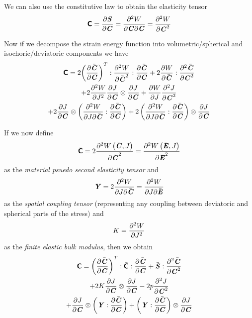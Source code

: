 We can also use the constitutive law to obtain the elasticity tensor \ie
\begin{equation}
  \tensorfour{C}=\delby{\tensor{S}}{\tensor{C}}=\deltwoby{W}{\tensor{C}}{\tensor{C}}=\deltwosqby{W}{\tensor{C}}
\end{equation}

Now if we decompose the strain energy function into volumetric/spherical and
isochoric/deviatoric components we have
\begin{multline}
  \tensorfour{C}=2\doubledotprod{\doubledotprod{\transpose{\pbrac{\delby{\bar{\tensor{C}}}{\tensor{C}}}}}{\deltwosqby{W}{\bar{\tensor{C}}}}}{\delby{\bar{\tensor{C}}}{\tensor{C}}}+2\doubledotprod{\delby{W}{\bar{\tensor{C}}}}{\deltwosqby{\bar{\tensor{C}}}{\tensor{C}}}\\
  +2\deltwosqby{W}{J}\tensorprod{\delby{J}{\tensor{C}}}{\delby{J}{\tensor{C}}}+\delby{W}{J}\deltwosqby{J}{\tensor{C}}\\
  +2\tensorprod{\delby{J}{\tensor{C}}}{\pbrac{\doubledotprod{\deltwoby{W}{J}{\bar{\tensor{C}}}}{\delby{\bar{\tensor{C}}}{\tensor{C}}}}}+2\tensorprod{\pbrac{\doubledotprod{\deltwoby{W}{J}{\bar{\tensor{C}}}}{\delby{\bar{\tensor{C}}}{\tensor{C}}}}}{\delby{J}{\tensor{C}}}
\end{multline}

If we now define
\begin{equation}
  \bar{\tensorfour{C}}=2\deltwosqby{\fnof{W}{\bar{\tensor{C}},J}}{\bar{\tensor{C}}}=\deltwosqby{\fnof{W}{\bar{\tensor{E}},J}}{\bar{\tensor{E}}}
\end{equation}
as the \emph{material psuedo second elasticity tensor} and
\begin{equation}
  \tensor{Y}=2\deltwoby{W}{J}{\bar{\tensor{C}}}=\deltwoby{W}{J}{\bar{\tensor{E}}}
\end{equation}
as the \emph{spatial coupling tensor} (\ie representing any coupling between
deviatoric and spherical parts of the stress) and
\begin{equation}
  K=\deltwosqby{W}{J}
\end{equation}
as the \emph{finite elastic bulk modulus}, then we obtain
\begin{multline}
  \tensorfour{C}=\doubledotprod{\doubledotprod{\transpose{\pbrac{\delby{\bar{\tensor{C}}}{\tensor{C}}}}}{\bar{\tensorfour{C}}}}{\delby{\bar{\tensor{C}}}{\tensor{C}}}+\doubledotprod{\bar{\tensor{S}}}{\deltwosqby{\bar{\tensor{C}}}{\tensor{C}}}\\
  +2K\tensorprod{\delby{J}{\tensor{C}}}{\delby{J}{\tensor{C}}}-2p\deltwosqby{J}{\tensor{C}}\\
  +\tensorprod{\delby{J}{\tensor{C}}}{\pbrac{\doubledotprod{\tensor{Y}}{\delby{\bar{\tensor{C}}}{\tensor{C}}}}}+\tensorprod{\pbrac{\doubledotprod{\tensor{Y}}{\delby{\bar{\tensor{C}}}{\tensor{C}}}}}{\delby{J}{\tensor{C}}}
\end{multline}


